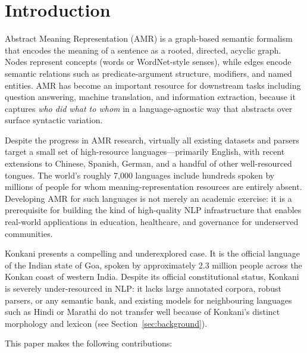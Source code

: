 \section{Introduction}
\label{sec:introduction}

Abstract Meaning Representation (AMR) \cite{banarescu2013abstract} is a graph-based semantic formalism that encodes the meaning of a sentence as a rooted, directed, acyclic graph. Nodes represent concepts (words or WordNet-style senses), while edges encode semantic relations such as predicate-argument structure, modifiers, and named entities. AMR has become an important resource for downstream tasks including question answering, machine translation, and information extraction, because it captures \emph{who did what to whom} in a language-agnostic way that abstracts over surface syntactic variation.

Despite the progress in AMR research, virtually all existing datasets and parsers target a small set of high-resource languages—primarily English, with recent extensions to Chinese, Spanish, German, and a handful of other well-resourced tongues. The world's roughly 7,000 languages include hundreds spoken by millions of people for whom meaning-representation resources are entirely absent. Developing AMR for such languages is not merely an academic exercise: it is a prerequisite for building the kind of high-quality NLP infrastructure that enables real-world applications in education, healthcare, and governance for underserved communities.

Konkani presents a compelling and underexplored case. It is the official language of the Indian state of Goa, spoken by approximately 2.3 million people across the Konkan coast of western India. Despite its official constitutional status, Konkani is severely under-resourced in NLP: it lacks large annotated corpora, robust parsers, or any semantic bank, and existing models for neighbouring languages such as Hindi or Marathi do not transfer well because of Konkani's distinct morphology and lexicon (see Section~\ref{sec:background}).

This paper makes the following contributions:

